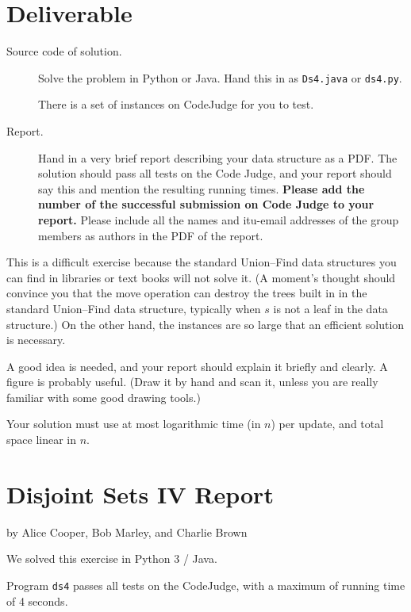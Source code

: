 \documentclass{tufte-handout}
\begin{document}
\section{Deliverable}

\begin{description}
  \item[Source code of solution.]
    Solve the problem in Python or Java.
    Hand this in as \texttt{Ds4.java} or \texttt{ds4.py}.

    There is a set of instances on CodeJudge for you to test.
  \item[Report.]
    Hand in a very brief report describing your data structure as a PDF. 
    The solution should pass all tests on the Code Judge, and your report should say this and mention the resulting running times.
    \textbf{Please add the number of the successful submission on Code Judge to your report.}
    Please include all the names and itu-email addresses of the group members as authors in the PDF of the report.
\end{description}

This is a difficult exercise because the standard Union--Find data structures you can find in libraries or text books will not solve it.
(A moment's thought should convince you that the move operation can destroy the trees built in in the standard Union--Find data structure, typically when $s$ is not a leaf in the data structure.)
On the other hand, the instances are so large that an efficient solution is necessary.

A good idea is needed, and your report should explain it briefly and clearly.
A figure is probably useful.
(Draw it by hand and scan it, unless you are really familiar with some good drawing tools.)

Your solution must use at most logarithmic time (in $n$) per update, and total space linear in $n$.

\newpage
\section{Disjoint Sets IV Report}

by Alice Cooper, Bob Marley, and Charlie Brown

  
  We solved this exercise in Python 3 / Java.

  Program \texttt{ds4} passes all tests on the CodeJudge, with a maximum of running time of 4 seconds.
\end{document}
